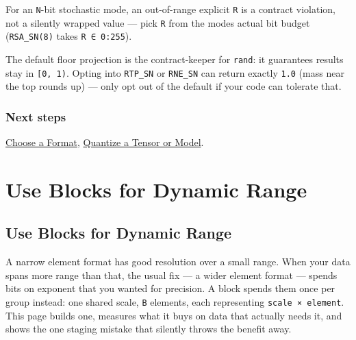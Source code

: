 \begin{tcolorbox}[toptitle=-1mm,bottomtitle=1mm,colback=admonition-note!50!white,colframe=admonition-note,title=\textbf{R must lie in `0:2{\textasciicircum}N-1`}]
For an \texttt{N}-bit stochastic mode, an out-of-range explicit \texttt{R} is a contract violation, not a silently wrapped value — pick \texttt{R} from the mode{\textquotesingle}s actual bit budget (\texttt{RSA\_\allowbreak{}SN(8)} takes \texttt{R ∈ 0:255}).

\end{tcolorbox}


\begin{tcolorbox}[toptitle=-1mm,bottomtitle=1mm,colback=admonition-warning!50!white,colframe=admonition-warning,title=\textbf{Nearest/ceiling can return exactly 1.0 from `rand`}]
The default floor projection is the contract-keeper for \texttt{rand}: it guarantees results stay in \texttt{[0, 1)}. Opting into \texttt{RTP\_\allowbreak{}SN} or \texttt{RNE\_\allowbreak{}SN} can return exactly \texttt{1.0} (mass near the top rounds up) — only opt out of the default if your code can tolerate that.

\end{tcolorbox}


\subsection{Next steps}



\label{3807517405601295309-dup1}{}


\href{workflow\_\allowbreak{}choose\_\allowbreak{}format.md}{Choose a Format}, \href{workflow\_\allowbreak{}quantize\_\allowbreak{}measure.md}{Quantize a Tensor or Model}.



\chapter{Use Blocks for Dynamic Range}


\section{Use Blocks for Dynamic Range}



\label{15598903235164527948}{}


A narrow element format has good resolution over a small range. When your data spans more range than that, the usual fix — a wider element format — spends bits on exponent that you wanted for precision. A block spends them once per group instead: one shared scale, \texttt{B} elements, each representing \texttt{scale × element}. This page builds one, measures what it buys on data that actually needs it, and shows the one staging mistake that silently throws the benefit away.



